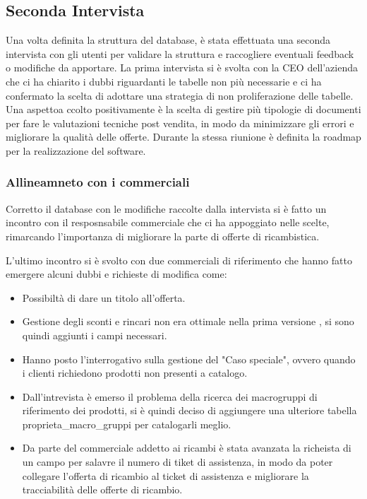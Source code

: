 \documentclass[12pt, a4paper]{article}
\begin{document}
\subsection{Seconda Intervista}
Una volta definita la struttura del database, è stata effettuata una seconda intervista con gli utenti per validare
la struttura e raccogliere eventuali feedback o modifiche da apportare.
La prima intervista si è svolta con la CEO dell'azienda che ci ha chiarito i dubbi riguardanti le tabelle non più necessarie e
ci ha confermato la scelta di adottare una strategia di non proliferazione delle tabelle.
Una aspettoa ccolto positivamente è la scelta di gestire più tipologie di documenti per fare le valutazioni tecniche post vendita,
in modo da minimizzare gli errori e migliorare la qualità delle offerte.
Durante la stessa riunione è definita la roadmap per la realizzazione del software.

\subsubsection{Allineamneto con i commerciali}
Corretto il database con le modifiche raccolte dalla intervista si è fatto un incontro con il resposnsabile commerciale che
ci ha appoggiato nelle scelte, rimarcando l'importanza di migliorare la parte di offerte di ricambistica.

L'ultimo incontro si è svolto con due commerciali di riferimento che hanno fatto emergere alcuni dubbi e richieste di modifica come:
\begin{itemize}
    \item Possibiltà di dare un titolo all'offerta.
    \item Gestione degli sconti e rincari non era ottimale nella prima versione , si sono quindi aggiunti i campi necessari.
    \item Hanno posto l'interrogativo sulla gestione del "Caso speciale", ovvero quando i clienti richiedono prodotti non presenti a catalogo.
    \item Dall'intrevista è emerso il problema della ricerca dei macrogruppi di riferimento dei prodotti, si è quindi deciso di aggiungere una ulteriore tabella proprieta\_macro\_gruppi per catalogarli meglio.
    \item Da parte del commerciale addetto ai ricambi è stata avanzata la richeista di un campo per salavre il numero di tiket di assistenza, in modo da poter collegare l'offerta di ricambio al ticket di assistenza e migliorare la tracciabilità delle offerte di ricambio.
\end{itemize}
\end{document}
